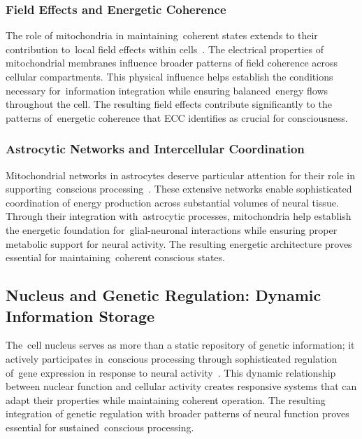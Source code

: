 \subsubsection{Field Effects and Energetic Coherence~~}

The role of mitochondria in maintaining~coherent states extends to their contribution to~local field effects within cells~\cite{hunt2024electromagnetic, Thar2004}. The electrical properties of mitochondrial membranes influence broader patterns of field coherence across cellular compartments. This physical influence helps establish the conditions necessary for~information integration while ensuring balanced~energy flows throughout the cell. The resulting field effects contribute significantly to the patterns of~energetic coherence that ECC identifies as crucial for consciousness.

\subsubsection{Astrocytic Networks and Intercellular Coordination~~}

Mitochondrial networks in astrocytes deserve particular attention for their role in supporting~conscious processing~\cite{Stephen2014, Verkhratsky2018}. These extensive networks enable sophisticated coordination of energy production across substantial volumes of neural tissue. Through their integration with~astrocytic processes, mitochondria help establish the energetic foundation for~glial-neuronal interactions while ensuring proper metabolic support for neural activity. The resulting energetic architecture proves essential for maintaining~coherent conscious states.

\subsection*{Nucleus and Genetic Regulation: Dynamic Information Storage~~}

The~cell nucleus serves as more than a static repository of genetic information; it actively participates in~conscious processing through sophisticated regulation of~gene expression in response to neural activity~\cite{Greenberg1986, Yap2018}. This dynamic relationship between nuclear function and cellular activity creates responsive systems that can adapt their properties while maintaining coherent operation. The resulting integration of genetic regulation with broader patterns of neural function proves essential for sustained~conscious processing.

